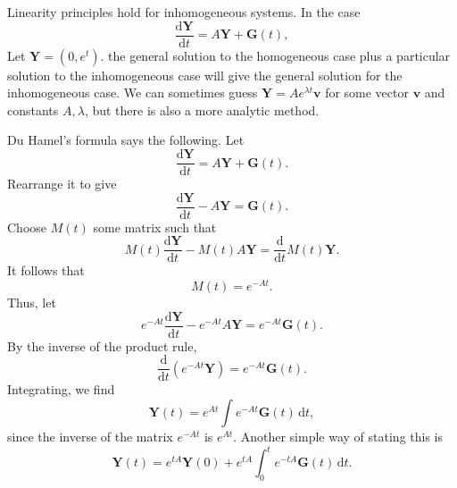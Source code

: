 Linearity principles hold for inhomogeneous systems. In the case
\[
	\frac{\mathrm{d}\mathbf{Y}}{\mathrm{d}t} =A \mathbf{Y}+\mathbf{G}(t)
,\]
Let $\mathbf{Y}=(0,e^t)$.
the general solution to the homogeneous case plus a particular solution to the inhomogeneous case will give the general solution for the inhomogeneous case. We can sometimes guess $\mathbf{Y}=Ae^{\lambda t}\mathbf{v}$ for some vector $\mathbf{v}$ and constants $A,\lambda $, but there is also a more analytic method.

Du Hamel's formula says the following. Let
	 \[
		\frac{\mathrm{d}\mathbf{Y}}{\mathrm{d}t} =A \mathbf{Y}+\mathbf{G}(t)
	.\]
Rearrange it to give
\[
	\frac{\mathrm{d}\mathbf{Y}}{\mathrm{d}t} -A \mathbf{Y}=\mathbf{G}(t)
.\]
Choose $M(t)$ some matrix such that
\[
	M(t)\frac{\mathrm{d}\mathbf{Y}}{\mathrm{d}t} -M(t)A \mathbf{Y}=\frac{\mathrm{d}}{\mathrm{d}t} M(t) \mathbf{Y}
.\]
It follows that
\[
	M(t)=e^{-At}
.\]
Thus, let
\[
	e^{-At}\frac{\mathrm{d}\mathbf{Y}}{\mathrm{d}t}-e^{-At}A \mathbf{Y}=e^{-At}\mathbf{G}(t)
.\]
By the inverse of the product rule,
\[
	\frac{\mathrm{d}}{\mathrm{d}t} \left( e^{-At}\mathbf{Y} \right) =e^{-At}\mathbf{G}(t)
.\]
Integrating, we find
\[
	\mathbf{Y}(t)=e^{At}\int e^{-At}\mathbf{G}(t) \,\mathrm{d} t
,\]
since the inverse of the matrix $e^{-At}$ is $e^{At}$. Another simple way of stating this is
\[
	\mathbf{Y}(t)=e^{tA}\mathbf{Y}(0)+e^{tA}\int_{0}^{t} e^{-tA}\mathbf{G}(t) \,\mathrm{d} t
.\]

